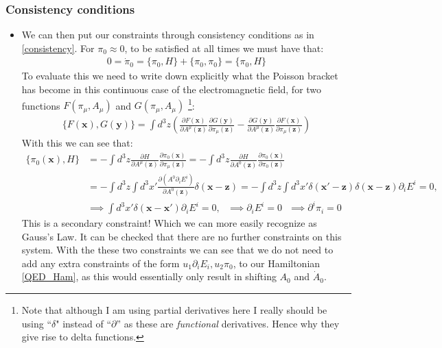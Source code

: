 \documentclass[11pt]{article}
\numberwithin{equation}{section}
\begin{document}
\subsubsection{Consistency conditions} %
\label{ssub:consistency_conditions}
\begin{itemize}
\item We can then put our constraints through consistency conditions as in \ref{consistency}. For $\pi_0 \approx 0$, to be satisfied at all times we must have that:
\begin{align*}
      0  = \dot{\pi}_0 = \{\pi_0,H\} +\{\pi_0,\pi_0\}  = \{\pi_0,H\}
\end{align*}
To evaluate this we need to write down explicitly what the Poisson bracket has become in this continuous case of the electromagnetic field, for two functions $F(\pi_{\mu},A_\mu)$ and $G(\pi_{\mu},A_\mu)$ \footnote{Note that although I am using partial derivatives here I really should be using ``$\delta$"  instead of ``$\partial$'' as these are \emph{functional} derivatives. Hence why they give rise to delta functions.}:
\begin{align}
           \label{Poisson_cont}
           \{F(\textbf{x}),G(\textbf{y})\} =  \int d^3z \left(\frac{\partial F(\textbf{x})}{\partial A^\mu(\textbf{z})}\frac{\partial G(\textbf{y})}{\partial \pi_\mu(\textbf{z})}-\frac{\partial G(\textbf{y})}{\partial A^\mu(\textbf{z})}\frac{\partial F(\textbf{x})}{\partial \pi_\mu(\textbf{z})}\right)
\end{align}
With this we can see that:
\begin{align*}
  \{\pi_0(\textbf{x}),H\} & = - \int d^3z\frac{\partial H}{\partial A^\mu(\textbf{z})}\frac{\partial \pi_0(\textbf{x})}{\partial \pi_\mu(\textbf{z})} = - \int d^3z\frac{\partial H}{\partial A^0(\textbf{z})}\frac{\partial \pi_0(\textbf{x})}{\partial \pi_0(\textbf{z})}   \\
  & =- \int d^3z\int d^3x'\frac{\partial (A^0\partial_iE^i)}{\partial A^0(\textbf{z})}\delta(\textbf{x}-\textbf{z})= - \int d^3z\int d^3x'\delta(\textbf{x}'-\textbf{z})\delta(\textbf{x}-\textbf{z})\partial_iE^i = 0 ,  \\ 
  & \implies \int d^3x'\delta(\textbf{x}-\textbf{x}')\partial_iE^i = 0, ~~~\implies \partial_iE^i = 0~~~\implies \partial^i\pi_i = 0
\end{align*}
This is a secondary constraint! Which we can more easily recognize as Gauss's Law. It can be checked that there are no further constraints on this system. With the these two constraints we can see that we do not need to add any extra constraints of the form $u_1\partial_iE_i,u_2\pi_0$, to our Hamiltonian \ref{QED_Ham}, as this would essentially only result in shifting $A_0$ and $\dot{A}_0$.  
\end{itemize}
\end{document}
